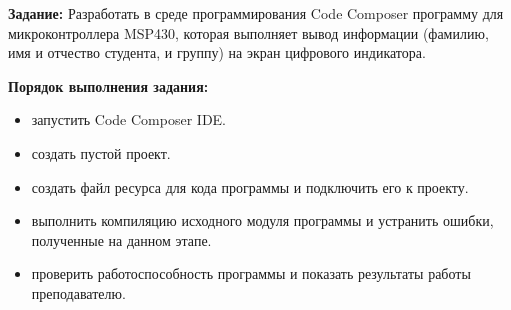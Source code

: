\textbf{Задание:} Разработать в среде программирования Code Composer
программу для микроконтроллера MSP430, которая выполняет вывод
информации (фамилию, имя и отчество студента, и группу) на экран
цифрового индикатора.

\textbf{Порядок выполнения задания:}

\begin{itemize}
\tightlist
\item
  запустить Code Composer IDE.
\item
  создать пустой проект.
\item
  создать файл ресурса для кода программы и подключить его к проекту.
\item
  выполнить компиляцию исходного модуля программы и устранить ошибки,
  полученные на данном этапе.
\item
  проверить работоспособность программы и показать результаты работы
  преподавателю.
\end{itemize}
